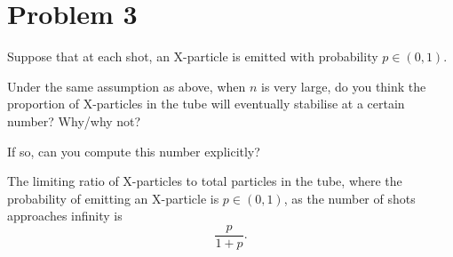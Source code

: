 \section{Problem 3}

Suppose that at each shot, an X-particle is emitted with probability $p \in (0, 1)$.

Under the same assumption as above, when $n$ is very large, do you think the proportion of X-particles in the tube will eventually stabilise at a certain number? Why/why not?

If so, can you compute this number explicitly?

\begin{theorem}
  The limiting ratio of X-particles to total particles in the tube, where the probability of emitting an X-particle is $p \in (0, 1)$, as the number of shots approaches infinity is \[
  \frac{p}{1+p}
  .\]
\end{theorem}
